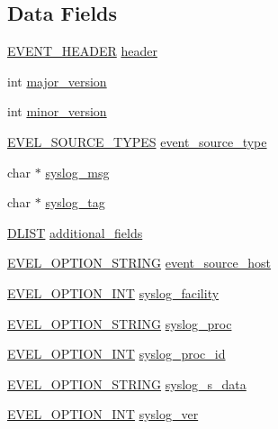 \subsection*{Data Fields}
\begin{DoxyCompactItemize}
\item 
\hyperlink{evel_8h_aa0ea94c675729365ea7825c4fc7e06d8}{E\+V\+E\+N\+T\+\_\+\+H\+E\+A\+D\+ER} \hyperlink{structevent__syslog_a32b365337bcb0b4e2930f8631990b48a}{header}
\item 
int \hyperlink{structevent__syslog_aa4b7dc9889e88d1bd6e9a0b19b035ee2}{major\+\_\+version}
\item 
int \hyperlink{structevent__syslog_ab85ca19f0c02ea459250186b48db3778}{minor\+\_\+version}
\item 
\hyperlink{evel_8h_a304eae0d024005dc4c7031bdd774d64a}{E\+V\+E\+L\+\_\+\+S\+O\+U\+R\+C\+E\+\_\+\+T\+Y\+P\+ES} \hyperlink{structevent__syslog_a08f3d14d55bcdd7c1a3e1887503c1576}{event\+\_\+source\+\_\+type}
\item 
char $\ast$ \hyperlink{structevent__syslog_a39eea73cdc0e3cb943984a3d3512b60f}{syslog\+\_\+msg}
\item 
char $\ast$ \hyperlink{structevent__syslog_a3557ae21ae635972d45ca3153b6c2dd5}{syslog\+\_\+tag}
\item 
\hyperlink{double__list_8h_a45f4a129042d9e1aa4ffd31fe13e4d14}{D\+L\+I\+ST} \hyperlink{structevent__syslog_ab832fb3de19d604690eeb5b232954923}{additional\+\_\+fields}
\item 
\hyperlink{evel_8h_a0de5113a7b72de93c0c7b644f7ea7ec3}{E\+V\+E\+L\+\_\+\+O\+P\+T\+I\+O\+N\+\_\+\+S\+T\+R\+I\+NG} \hyperlink{structevent__syslog_a47953309ed3ba9092682b173c4ba3d05}{event\+\_\+source\+\_\+host}
\item 
\hyperlink{evel_8h_a452d825778d1c2368a54b8f689a25ba7}{E\+V\+E\+L\+\_\+\+O\+P\+T\+I\+O\+N\+\_\+\+I\+NT} \hyperlink{structevent__syslog_a9fb37e74aebac50216f92ee162ea1ce0}{syslog\+\_\+facility}
\item 
\hyperlink{evel_8h_a0de5113a7b72de93c0c7b644f7ea7ec3}{E\+V\+E\+L\+\_\+\+O\+P\+T\+I\+O\+N\+\_\+\+S\+T\+R\+I\+NG} \hyperlink{structevent__syslog_a6a947760f13659ef7c19d0cc8b5dc315}{syslog\+\_\+proc}
\item 
\hyperlink{evel_8h_a452d825778d1c2368a54b8f689a25ba7}{E\+V\+E\+L\+\_\+\+O\+P\+T\+I\+O\+N\+\_\+\+I\+NT} \hyperlink{structevent__syslog_a92b4ef63a8eea577abf3d3b8eb9dc5fc}{syslog\+\_\+proc\+\_\+id}
\item 
\hyperlink{evel_8h_a0de5113a7b72de93c0c7b644f7ea7ec3}{E\+V\+E\+L\+\_\+\+O\+P\+T\+I\+O\+N\+\_\+\+S\+T\+R\+I\+NG} \hyperlink{structevent__syslog_a344ff4a09974d2022f451ed19f152ecf}{syslog\+\_\+s\+\_\+data}
\item 
\hyperlink{evel_8h_a452d825778d1c2368a54b8f689a25ba7}{E\+V\+E\+L\+\_\+\+O\+P\+T\+I\+O\+N\+\_\+\+I\+NT} \hyperlink{structevent__syslog_abcc8429fda3a05591c3e706def0e3e67}{syslog\+\_\+ver}
\end{DoxyCompactItemize}


